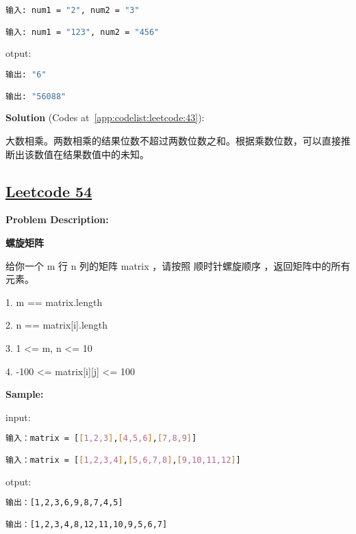 \begin{lstlisting}[language=bash]
输入: num1 = "2", num2 = "3"

输入: num1 = "123", num2 = "456"
\end{lstlisting}

otput:\par

\begin{lstlisting}[language=bash]
输出: "6"

输出: "56088"
\end{lstlisting}

\textbf{Solution }(Codes at~\ref{app:codelist:leetcode:43}):\par

大数相乘。两数相乘的结果位数不超过两数位数之和。根据乘数位数，可以直接推断出该数值在结果数值中的未知。\par



\subsection{\href{https://leetcode-cn.com/}{Leetcode 54}}\label{app:problemlist:leetcode:54}

\textbf{Problem Description:}\par

\textbf{螺旋矩阵}\par

给你一个 m 行 n 列的矩阵 matrix ，请按照 顺时针螺旋顺序 ，返回矩阵中的所有元素。\par

1. m == matrix.length\par
2. n == matrix[i].length\par
3. 1 <= m, n <= 10\par
4. -100 <= matrix[i][j] <= 100\par


\textbf{Sample:}\par

input:\par

\begin{lstlisting}[language=bash]
输入：matrix = [[1,2,3],[4,5,6],[7,8,9]]

输入：matrix = [[1,2,3,4],[5,6,7,8],[9,10,11,12]]
\end{lstlisting}

otput:\par

\begin{lstlisting}[language=bash]
输出：[1,2,3,6,9,8,7,4,5]

输出：[1,2,3,4,8,12,11,10,9,5,6,7]
\end{lstlisting}

